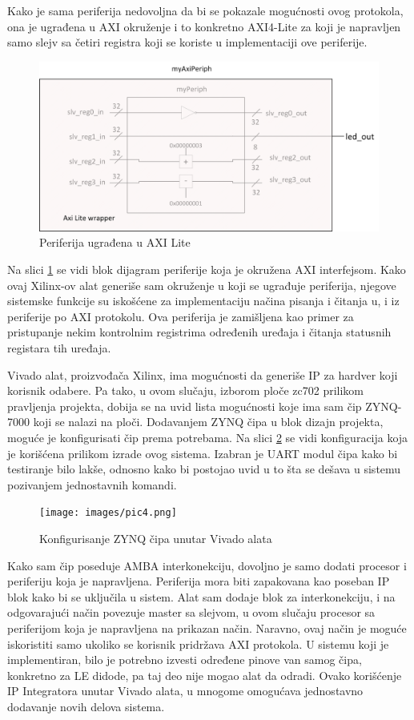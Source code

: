\documentclass[a4paper, 12pt, diplomski]{etf}
\begin{document}
	Kako je sama periferija nedovoljna da bi se pokazale mogućnosti ovog protokola, ona je ugrađena u AXI okruženje i to konkretno AXI4-Lite za koji je napravljen samo slejv sa četiri registra koji se koriste u implementaciji ove periferije.

	\begin{figure}[htb]
		\centering
		\includegraphics[width=.7\textwidth]{images/myaxiperiph.png}
		\caption{Periferija ugrađena u AXI Lite}
		\label{fig:myaxilite}
	\end{figure}

	Na slici \ref{fig:myaxilite} se vidi blok dijagram periferije koja je okružena AXI interfejsom. Kako ovaj Xilinx-ov alat generiše sam okruženje u koji se ugrađuje periferija, njegove sistemske funkcije su iskošćene za implementaciju načina pisanja i čitanja u, i iz periferije po AXI protokolu. Ova periferija je zamišljena kao primer za pristupanje nekim kontrolnim registrima određenih uređaja i čitanja statusnih registara tih uređaja.

	Vivado alat, proizvođača Xilinx, ima mogućnosti da generiše IP za hardver koji korisnik odabere. Pa tako, u ovom slučaju, izborom ploče zc702 prilikom pravljenja projekta, dobija se na uvid lista mogućnosti koje ima sam čip ZYNQ-7000 koji se nalazi na ploči. Dodavanjem ZYNQ čipa u blok dizajn projekta, moguće je konfigurisati čip prema potrebama. Na slici \ref{fig:zynqConfig} se vidi konfiguracija koja je korišćena prilikom izrade ovog sistema. Izabran je UART modul čipa kako bi testiranje bilo lakše, odnosno kako bi postojao uvid u to šta se dešava u sistemu pozivanjem jednostavnih komandi.

	\begin{figure}[h!]
		\centering
		\texttt{[image: images/pic4.png]}
		\caption{Konfigurisanje ZYNQ čipa unutar Vivado alata}
		\label{fig:zynqConfig}
	\end{figure}

	Kako sam čip poseduje AMBA interkonekciju, dovoljno je samo dodati procesor i periferiju koja je napravljena. Periferija mora biti zapakovana kao poseban IP blok kako bi se uključila u sistem. Alat sam dodaje blok za interkonekciju, i na odgovarajući način povezuje master sa slejvom, u ovom slučaju procesor sa periferijom koja je napravljena na prikazan način. Naravno, ovaj način je moguće iskoristiti samo ukoliko se korisnik pridržava AXI protokola.	U sistemu koji je implementiran, bilo je potrebno izvesti određene pinove van samog čipa, konkretno za LE didode, pa taj deo nije mogao alat da odradi. Ovako korišćenje IP Integratora unutar Vivado alata, u mnogome omogućava jednostavno dodavanje novih delova sistema.
\end{document}
